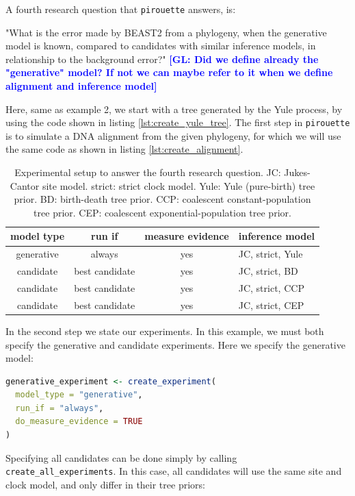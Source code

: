 \documentclass{article}
\newcommand{\giovanni}[1]{\textcolor{blue}{\textbf{[GL: #1]}}}
\begin{document}
A fourth research question that \verb;pirouette; answers, is:

"What is the error made by BEAST2 from a phylogeny, when the generative model is known, compared to candidates with similar inference models, in relationship to the background error?"
\giovanni{Did we define already the "generative" model? If not we can maybe refer to it when we define alignment and inference model}

Here, same as example 2, we start with a tree generated by the Yule process, by using the code shown in listing \ref{lst:create_yule_tree}.
The first step in \verb;pirouette; is to simulate a DNA alignment 
from the given phylogeny, for which we will use the same code 
as shown in listing \ref{lst:create_alignment}.

\begin{table}
  \begin{tabular}{ | c | c | c | l | }
    \hline
    \textbf{model type} & \textbf{run if} & \textbf{measure evidence} & \textbf{inference model} \\ 
    \hline
    generative & always         & yes & JC, strict, Yule \\
    candidate  & best candidate & yes & JC, strict, BD \\
    candidate  & best candidate & yes & JC, strict, CCP \\
    candidate  & best candidate & yes & JC, strict, CEP \\
    \hline
  \end{tabular}
  \caption{
    Experimental setup to answer the fourth research question.
    JC: Jukes-Cantor site model.
    strict: strict clock model.
    Yule: Yule (pure-birth) tree prior.
    BD: birth-death tree prior.
    CCP: coalescent constant-population tree prior.
    CEP: coalescent exponential-population tree prior.
  }
  \label{tab:experiment_4}
\end{table}

In the second step we state our experiments. 
In this example, we must both specify the generative and candidate experiments. Here we specify the generative model:

\begin{lstlisting}[language=R, floatplacement=H, frame=single]
generative_experiment <- create_experiment(
  model_type = "generative",
  run_if = "always",
  do_measure_evidence = TRUE
)
\end{lstlisting}

Specifying all candidates can be done simply by calling \verb;create_all_experiments;. In this case, all candidates will use the same site and clock model, and only differ in their tree priors:
\end{document}
